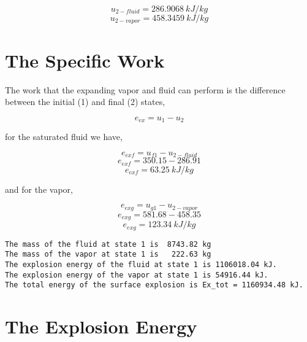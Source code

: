 \documentclass[10pt,parskip=half,
toc=sectionentrywithdots,
bibliography=totocnumbered,
captions=tableheading,numbers=noendperiod]{scrartcl}
\begin{document}
\begin{equation}u_{2-fluid} = 286.9068\:kJ/kg\end{equation}
\begin{equation}u_{2-vapor} = 458.3459\:kJ/kg\end{equation}

\hypertarget{the-specific-work}{%
\section{The Specific Work}\label{the-specific-work}}

The work that the expanding vapor and fluid can perform is the
difference between the initial (1) and final (2) states,

\begin{equation}e_{ex} = u_1 - u_2\end{equation}

for the saturated fluid we have,

\begin{equation}e_{exf} = u_{f1} - u_{2-fluid}\end{equation}
\begin{equation}e_{exf} = 350.15 - 286.91\end{equation}
\begin{equation}e_{exf} = 63.25\:kJ/kg\end{equation}

and for the vapor,

\begin{equation}e_{exg} = u_{g1} - u_{2-vapor}\end{equation}
\begin{equation}e_{exg} = 581.68 - 458.35\end{equation}
\begin{equation}e_{exg} = 123.34\:kJ/kg\end{equation}

\begin{lstlisting}[language={},postbreak={},numbers=none,xrightmargin=7pt,belowskip=5pt,aboveskip=5pt,breakindent=0pt]
The mass of the fluid at state 1 is  8743.82 kg
The mass of the vapor at state 1 is   222.63 kg
The explosion energy of the fluid at state 1 is 1106018.04 kJ.
The explosion energy of the vapor at state 1 is 54916.44 kJ.
The total energy of the surface explosion is Ex_tot = 1160934.48 kJ.

\end{lstlisting}

\hypertarget{the-explosion-energy}{%
\section{The Explosion Energy}\label{the-explosion-energy}}
\end{document}
